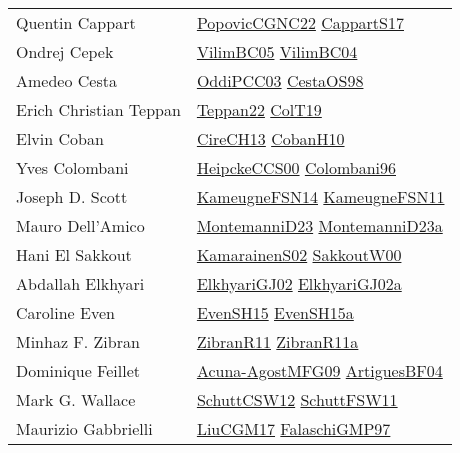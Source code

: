 {\begin{longtable}{p{4cm}p{20cm}}
Quentin Cappart & \href{papers/PopovicCGNC22.pdf}{PopovicCGNC22}\cite{PopovicCGNC22} \href{papers/CappartS17.pdf}{CappartS17}\cite{CappartS17} \\
Ondrej Cepek & \href{articles/VilimBC05.pdf}{VilimBC05}\cite{VilimBC05} \href{papers/VilimBC04.pdf}{VilimBC04}\cite{VilimBC04} \\
Amedeo Cesta & \href{papers/OddiPCC03.pdf}{OddiPCC03}\cite{OddiPCC03} \href{papers/CestaOS98.pdf}{CestaOS98}\cite{CestaOS98} \\
Erich Christian Teppan & \href{papers/Teppan22.pdf}{Teppan22}\cite{Teppan22} \href{papers/ColT19.pdf}{ColT19}\cite{ColT19} \\
Elvin Coban & \href{papers/CireCH13.pdf}{CireCH13}\cite{CireCH13} \href{papers/CobanH10.pdf}{CobanH10}\cite{CobanH10} \\
Yves Colombani & \href{articles/HeipckeCCS00.pdf}{HeipckeCCS00}\cite{HeipckeCCS00} \href{papers/Colombani96.pdf}{Colombani96}\cite{Colombani96} \\
Joseph D. Scott & \href{articles/KameugneFSN14.pdf}{KameugneFSN14}\cite{KameugneFSN14} \href{papers/KameugneFSN11.pdf}{KameugneFSN11}\cite{KameugneFSN11} \\
Mauro Dell'Amico & \href{articles/MontemanniD23.pdf}{MontemanniD23}\cite{MontemanniD23} \href{articles/MontemanniD23a.pdf}{MontemanniD23a}\cite{MontemanniD23a} \\
Hani El Sakkout & \href{papers/KamarainenS02.pdf}{KamarainenS02}\cite{KamarainenS02} \href{articles/SakkoutW00.pdf}{SakkoutW00}\cite{SakkoutW00} \\
Abdallah Elkhyari & \href{papers/ElkhyariGJ02.pdf}{ElkhyariGJ02}\cite{ElkhyariGJ02} \href{papers/ElkhyariGJ02a.pdf}{ElkhyariGJ02a}\cite{ElkhyariGJ02a} \\
Caroline Even & \href{papers/EvenSH15.pdf}{EvenSH15}\cite{EvenSH15} \href{articles/EvenSH15a.pdf}{EvenSH15a}\cite{EvenSH15a} \\
Minhaz F. Zibran & \href{papers/ZibranR11.pdf}{ZibranR11}\cite{ZibranR11} \href{papers/ZibranR11a.pdf}{ZibranR11a}\cite{ZibranR11a} \\
Dominique Feillet & \href{papers/Acuna-AgostMFG09.pdf}{Acuna-AgostMFG09}\cite{Acuna-AgostMFG09} \href{papers/ArtiguesBF04.pdf}{ArtiguesBF04}\cite{ArtiguesBF04} \\
Mark G. Wallace & \href{papers/SchuttCSW12.pdf}{SchuttCSW12}\cite{SchuttCSW12} \href{articles/SchuttFSW11.pdf}{SchuttFSW11}\cite{SchuttFSW11} \\
Maurizio Gabbrielli & \href{papers/LiuCGM17.pdf}{LiuCGM17}\cite{LiuCGM17} \href{articles/FalaschiGMP97.pdf}{FalaschiGMP97}\cite{FalaschiGMP97} \\

\end{longtable}}
